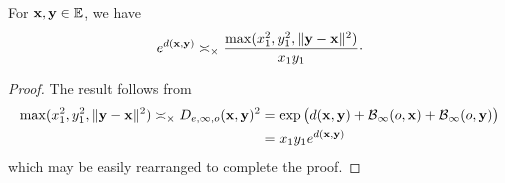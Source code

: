 \begin{corollary}
\label{corollarysullivansformula}
For $\xx,\yy\in\E$, we have 
\[
e^{d(\mathbf x,\mathbf y)} \asymp_\times \frac{\max(x_1^2,y_1^2,\|\mathbf y - \mathbf x\|^2)}{x_1 y_1}\cdot
\]
\end{corollary}
\begin{proof}
The result follows from 
\begin{align*}
\max(x_1^2,y_1^2,\|\mathbf y - \mathbf x\|^2) \asymp_\times D_{e,\infty,o}(\mathbf x,\mathbf y)^2
&= \exp\big(d(\mathbf x,\mathbf y) + \operatorname{\mathcal B}_\infty(o,\mathbf x) + \operatorname{\mathcal B}_\infty(o,\mathbf y)\big)\\
&= x_1 y_1 e^{d(\mathbf x,\mathbf y)}
\end{align*}
which may be easily rearranged to complete the proof.
\end{proof}








